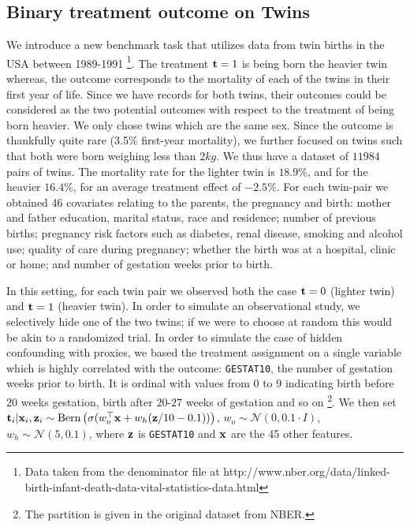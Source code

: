 \subsection{Binary treatment outcome on Twins}
We introduce a new benchmark task that utilizes data from twin births in the USA between 1989-1991 \citep{almond2005costs} \footnote{Data taken from the denominator file at http://www.nber.org/data/linked-birth-infant-death-data-vital-statistics-data.html}. The treatment $\mathbf{t}=1$ is being born the heavier twin whereas, the outcome corresponds to the mortality of each of the twins in their first year of life. Since we have records for both twins, their outcomes could be considered as the two potential outcomes with respect to the treatment of being born heavier. We only chose twins which are the same sex. Since the outcome is thankfully quite rare (3.5\% first-year mortality), we further focused on twins such that both were born weighing less than $2kg$. We thus have a dataset of $11984$ pairs of twins. The mortality rate for the lighter twin is $18.9\%$, and for the heavier $16.4\%$, for an average treatment effect of $-2.5\%$. For each twin-pair we obtained 46 covariates relating to the parents, the pregnancy and birth: mother and father education, marital status, race and residence; number of previous births; pregnancy risk factors such as diabetes, renal disease, smoking and alcohol use; quality of care during pregnancy; whether the birth was at a hospital, clinic or home; and number of gestation weeks prior to birth. 

In this setting, for each twin pair we observed both the case $\mathbf{t}=0$ (lighter twin) and $\mathbf{t}=1$ (heavier twin). In order to simulate an observational study, we selectively hide one of the two twins; if we were to choose at random this would be akin to a randomized trial. In order to simulate the case of hidden confounding with proxies, we based the treatment assignment on a single variable which is highly correlated with the outcome: \texttt{GESTAT10}, the number of gestation weeks prior to birth. It is ordinal with values from $0$ to $9$ indicating birth before $20$ weeks gestation, birth after $20$-$27$ weeks of gestation and so on \footnote{The partition is given in the original dataset from NBER.}. 
We then set $ \mathbf{t}_i |\mathbf{x}_i, \mathbf{z}_i \sim \text{Bern}\left(\sigma(w_o^\top \mathbf{x} +w_h (\mathbf{z}/10-0.1))\right)$, $w_o \sim \mathcal{N}(0,0.1 \cdot I)$, $w_h \sim \mathcal{N}(5,0.1)$, where $\mathbf{z}$ is \texttt{GESTAT10} and $\mathbf{x}$ are the 45 other features.

